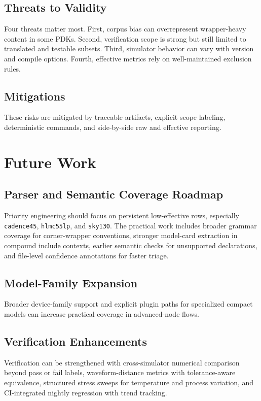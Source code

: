 \documentclass[12pt,a4paper,oneside]{report}
\begin{document}
\section{Threats to Validity}
Four threats matter most. First, corpus bias can overrepresent wrapper-heavy content in some PDKs. Second, verification scope is strong but still limited to translated and testable subsets. Third, simulator behavior can vary with version and compile options. Fourth, effective metrics rely on well-maintained exclusion rules.

\section{Mitigations}
These risks are mitigated by traceable artifacts, explicit scope labeling, deterministic commands, and side-by-side raw and effective reporting.

\chapter{Future Work}

\section{Parser and Semantic Coverage Roadmap}
Priority engineering should focus on persistent low-effective rows, especially \texttt{cadence45}, \texttt{hlmc55lp}, and \texttt{sky130}. The practical work includes broader grammar coverage for corner-wrapper conventions, stronger model-card extraction in compound include contexts, earlier semantic checks for unsupported declarations, and file-level confidence annotations for faster triage.

\section{Model-Family Expansion}
Broader device-family support and explicit plugin paths for specialized compact models can increase practical coverage in advanced-node flows.

\section{Verification Enhancements}
Verification can be strengthened with cross-simulator numerical comparison beyond pass or fail labels, waveform-distance metrics with tolerance-aware equivalence, structured stress sweeps for temperature and process variation, and CI-integrated nightly regression with trend tracking.
\end{document}
